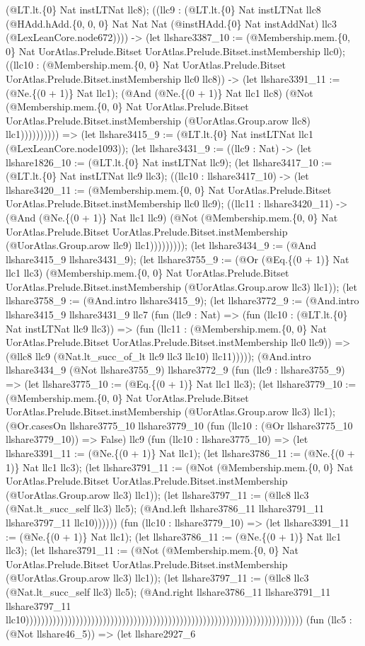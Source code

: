 \documentclass[11pt]{article}
\begin{document}
(@LT.lt.\{0\} Nat instLTNat llc8); ((llc9 : (@LT.lt.\{0\} Nat instLTNat llc8 (@HAdd.hAdd.\{0, 0, 0\} Nat Nat Nat (@instHAdd.\{0\} Nat instAddNat) llc3 (@LexLeanCore.node672)))) -> (let llshare3387\_10 := (@Membership.mem.\{0, 0\} Nat UorAtlas.Prelude.Bitset UorAtlas.Prelude.Bitset.instMembership llc0); ((llc10 : (@Membership.mem.\{0, 0\} Nat UorAtlas.Prelude.Bitset UorAtlas.Prelude.Bitset.instMembership llc0 llc8)) -> (let llshare3391\_11 := (@Ne.\{(0 + 1)\} Nat llc1); (@And (@Ne.\{(0 + 1)\} Nat llc1 llc8) (@Not (@Membership.mem.\{0, 0\} Nat UorAtlas.Prelude.Bitset UorAtlas.Prelude.Bitset.instMembership (@UorAtlas.Group.arow llc8) llc1)))))))))) => (let llshare3415\_9 := (@LT.lt.\{0\} Nat instLTNat llc1 (@LexLeanCore.node1093)); (let llshare3431\_9 := ((llc9 : Nat) -> (let llshare1826\_10 := (@LT.lt.\{0\} Nat instLTNat llc9); (let llshare3417\_10 := (@LT.lt.\{0\} Nat instLTNat llc9 llc3); ((llc10 : llshare3417\_10) -> (let llshare3420\_11 := (@Membership.mem.\{0, 0\} Nat UorAtlas.Prelude.Bitset UorAtlas.Prelude.Bitset.instMembership llc0 llc9); ((llc11 : llshare3420\_11) -> (@And (@Ne.\{(0 + 1)\} Nat llc1 llc9) (@Not (@Membership.mem.\{0, 0\} Nat UorAtlas.Prelude.Bitset UorAtlas.Prelude.Bitset.instMembership (@UorAtlas.Group.arow llc9) llc1))))))))); (let llshare3434\_9 := (@And llshare3415\_9 llshare3431\_9); (let llshare3755\_9 := (@Or (@Eq.\{(0 + 1)\} Nat llc1 llc3) (@Membership.mem.\{0, 0\} Nat UorAtlas.Prelude.Bitset UorAtlas.Prelude.Bitset.instMembership (@UorAtlas.Group.arow llc3) llc1)); (let llshare3758\_9 := (@And.intro llshare3415\_9); (let llshare3772\_9 := (@And.intro llshare3415\_9 llshare3431\_9 llc7 (fun (llc9 : Nat) => (fun (llc10 : (@LT.lt.\{0\} Nat instLTNat llc9 llc3)) => (fun (llc11 : (@Membership.mem.\{0, 0\} Nat UorAtlas.Prelude.Bitset UorAtlas.Prelude.Bitset.instMembership llc0 llc9)) => (@llc8 llc9 (@Nat.lt\_succ\_of\_lt llc9 llc3 llc10) llc11))))); (@And.intro llshare3434\_9 (@Not llshare3755\_9) llshare3772\_9 (fun (llc9 : llshare3755\_9) => (let llshare3775\_10 := (@Eq.\{(0 + 1)\} Nat llc1 llc3); (let llshare3779\_10 := (@Membership.mem.\{0, 0\} Nat UorAtlas.Prelude.Bitset UorAtlas.Prelude.Bitset.instMembership (@UorAtlas.Group.arow llc3) llc1); (@Or.casesOn llshare3775\_10 llshare3779\_10 (fun (llc10 : (@Or llshare3775\_10 llshare3779\_10)) => False) llc9 (fun (llc10 : llshare3775\_10) => (let llshare3391\_11 := (@Ne.\{(0 + 1)\} Nat llc1); (let llshare3786\_11 := (@Ne.\{(0 + 1)\} Nat llc1 llc3); (let llshare3791\_11 := (@Not (@Membership.mem.\{0, 0\} Nat UorAtlas.Prelude.Bitset UorAtlas.Prelude.Bitset.instMembership (@UorAtlas.Group.arow llc3) llc1)); (let llshare3797\_11 := (@llc8 llc3 (@Nat.lt\_succ\_self llc3) llc5); (@And.left llshare3786\_11 llshare3791\_11 llshare3797\_11 llc10)))))) (fun (llc10 : llshare3779\_10) => (let llshare3391\_11 := (@Ne.\{(0 + 1)\} Nat llc1); (let llshare3786\_11 := (@Ne.\{(0 + 1)\} Nat llc1 llc3); (let llshare3791\_11 := (@Not (@Membership.mem.\{0, 0\} Nat UorAtlas.Prelude.Bitset UorAtlas.Prelude.Bitset.instMembership (@UorAtlas.Group.arow llc3) llc1)); (let llshare3797\_11 := (@llc8 llc3 (@Nat.lt\_succ\_self llc3) llc5); (@And.right llshare3786\_11 llshare3791\_11 llshare3797\_11 llc10)))))))))))))))))))))))))))))))))))))))))))))))))))))))))))))))))))))))) (fun (llc5 : (@Not llshare46\_5)) => (let llshare2927\_6 
\end{document}

